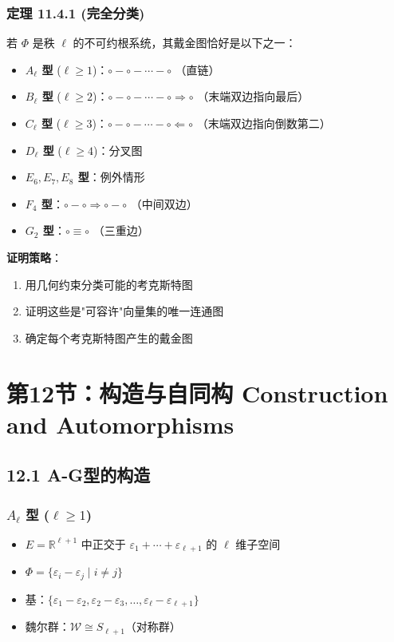 \subsubsection{定理 11.4.1 (完全分类)}

若 $\Phi$ 是秩 $\ell$ 的不可约根系统，其戴金图恰好是以下之一：

\begin{itemize}
	\item \textbf{$A_\ell$ 型} ($\ell \geq 1$)：$\circ - \circ - \cdots - \circ$ （直链）
	\item \textbf{$B_\ell$ 型} ($\ell \geq 2$)：$\circ - \circ - \cdots - \circ \Rightarrow \circ$ （末端双边指向最后）
	\item \textbf{$C_\ell$ 型} ($\ell \geq 3$)：$\circ - \circ - \cdots - \circ \Leftarrow \circ$ （末端双边指向倒数第二）
	\item \textbf{$D_\ell$ 型} ($\ell \geq 4$)：分叉图
	\item \textbf{$E_6, E_7, E_8$ 型}：例外情形
	\item \textbf{$F_4$ 型}：$\circ - \circ \Rightarrow \circ - \circ$ （中间双边）
	\item \textbf{$G_2$ 型}：$\circ \equiv \circ$ （三重边）
\end{itemize}

\textbf{证明策略}：

\begin{enumerate}
	\item 用几何约束分类可能的考克斯特图
	\item 证明这些是"可容许"向量集的唯一连通图
	\item 确定每个考克斯特图产生的戴金图
\end{enumerate}


\section{第12节：构造与自同构 Construction and Automorphisms}

\subsection{12.1 A-G型的构造}

\subsubsection{\texorpdfstring{$A_\ell$}{A_ell} 型 (\texorpdfstring{$\ell \geq 1$}{ell geq 1})}

\begin{itemize}
	\item $E = \mathbb{R}^{\ell+1}$ 中正交于 $\varepsilon_1 + \cdots + \varepsilon_{\ell+1}$ 的 $\ell$ 维子空间
	\item $\Phi = \{\varepsilon_i - \varepsilon_j \mid i \neq j\}$
	\item 基：$\{\varepsilon_1 - \varepsilon_2, \varepsilon_2 - \varepsilon_3, \ldots, \varepsilon_\ell - \varepsilon_{\ell+1}\}$
	\item 魏尔群：$\mathcal{W} \cong S_{\ell+1}$（对称群）
\end{itemize}

